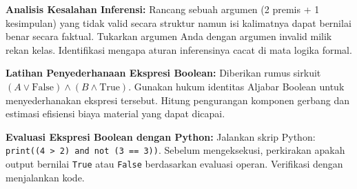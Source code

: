 \documentclass[../main]{subfiles}
\begin{document}








\begin{aktivitas}
  \item \textbf{Analisis Kesalahan Inferensi:} Rancang sebuah argumen (2 premis + 1 kesimpulan) yang tidak valid secara struktur namun isi kalimatnya dapat bernilai benar secara faktual. Tukarkan argumen Anda dengan argumen invalid milik rekan kelas. Identifikasi mengapa aturan inferensinya cacat di mata logika formal.
  \item \textbf{Latihan Penyederhanaan Ekspresi Boolean:} Diberikan rumus sirkuit $(A \lor \text{False}) \land (B \land \text{True})$. Gunakan hukum identitas Aljabar Boolean untuk menyederhanakan ekspresi tersebut. Hitung pengurangan komponen gerbang dan estimasi efisiensi biaya material yang dapat dicapai.
  \item \textbf{Evaluasi Ekspresi Boolean dengan Python:} Jalankan skrip Python: \texttt{print((4 > 2) and not (3 == 3))}. Sebelum mengeksekusi, perkirakan apakah output bernilai \texttt{True} atau \texttt{False} berdasarkan evaluasi operan. Verifikasi dengan menjalankan kode.
\end{aktivitas}

\end{document}
